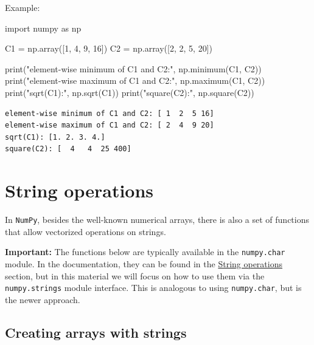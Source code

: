 \documentclass[
  english,
  letterpaper,
  DIV=11,
  numbers=noendperiod]{scrreprt}
\newenvironment{Shaded}{\begin{snugshade}}{\end{snugshade}}
\newcommand{\BuiltInTok}[1]{\textcolor[rgb]{0.00,0.23,0.31}{#1}}
\newcommand{\DecValTok}[1]{\textcolor[rgb]{0.68,0.00,0.00}{#1}}
\newcommand{\ImportTok}[1]{\textcolor[rgb]{0.00,0.46,0.62}{#1}}
\newcommand{\NormalTok}[1]{\textcolor[rgb]{0.00,0.23,0.31}{#1}}
\newcommand{\OperatorTok}[1]{\textcolor[rgb]{0.37,0.37,0.37}{#1}}
\newcommand{\StringTok}[1]{\textcolor[rgb]{0.13,0.47,0.30}{#1}}
\begin{document}
Example:

\begin{Shaded}
\begin{Highlighting}[]
\ImportTok{import}\NormalTok{ numpy }\ImportTok{as}\NormalTok{ np}

\NormalTok{C1 }\OperatorTok{=}\NormalTok{ np.array([}\DecValTok{1}\NormalTok{, }\DecValTok{4}\NormalTok{, }\DecValTok{9}\NormalTok{, }\DecValTok{16}\NormalTok{])}
\NormalTok{C2 }\OperatorTok{=}\NormalTok{ np.array([}\DecValTok{2}\NormalTok{, }\DecValTok{2}\NormalTok{, }\DecValTok{5}\NormalTok{, }\DecValTok{20}\NormalTok{])}

\BuiltInTok{print}\NormalTok{(}\StringTok{"element{-}wise minimum of C1 and C2:"}\NormalTok{, np.minimum(C1, C2))}
\BuiltInTok{print}\NormalTok{(}\StringTok{"element{-}wise maximum of C1 and C2:"}\NormalTok{, np.maximum(C1, C2))}
\BuiltInTok{print}\NormalTok{(}\StringTok{"sqrt(C1):"}\NormalTok{, np.sqrt(C1))}
\BuiltInTok{print}\NormalTok{(}\StringTok{"square(C2):"}\NormalTok{, np.square(C2))}
\end{Highlighting}
\end{Shaded}

\begin{verbatim}
element-wise minimum of C1 and C2: [ 1  2  5 16]
element-wise maximum of C1 and C2: [ 2  4  9 20]
sqrt(C1): [1. 2. 3. 4.]
square(C2): [  4   4  25 400]
\end{verbatim}

\chapter{String operations}\label{string-operations}

In \texttt{NumPy}, besides the well-known numerical arrays, there is
also a set of functions that allow vectorized operations on strings.

\textbf{Important:} The functions below are typically available in the
\texttt{numpy.char} module. In the documentation, they can be found in
the
\href{https://numpy.org/doc/stable/reference/routines.strings.html}{String
operations} section, but in this material we will focus on how to use
them via the \texttt{numpy.strings} module interface. This is analogous
to using \texttt{numpy.char}, but is the newer approach.

\section{Creating arrays with
strings}\label{creating-arrays-with-strings}
\end{document}
